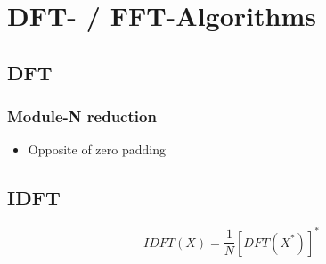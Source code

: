 \section{DFT- / FFT-Algorithms}

\subsection{DFT}
\subsubsection{Module-N reduction}
\begin{itemize}
	\item Opposite of zero padding
\end{itemize}

\subsection{IDFT}

\begin{equation}
	IDFT(X) = \frac{1}{N}\left[DFT(X^*)\right]^*
	\label{eq:IDFT}
\end{equation}

